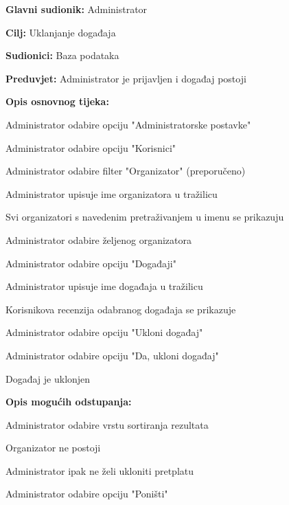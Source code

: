 					\noindent {}
					\begin{packed_item}
	
						\item \textbf{Glavni sudionik:} Administrator
						\item  \textbf{Cilj:} Uklanjanje događaja
						\item  \textbf{Sudionici:} Baza podataka
						\item  \textbf{Preduvjet:} Administrator je prijavljen i događaj postoji
						\item  \textbf{Opis osnovnog tijeka:}
						
						\item[] \begin{packed_enum}
	
							\item Administrator odabire opciju "Administratorske postavke"
							\item Administrator odabire opciju "Korisnici"
							\item Administrator odabire filter "Organizator" (preporučeno)
							\item Administrator upisuje ime organizatora u tražilicu
							\item Svi organizatori s navedenim pretraživanjem u imenu se prikazuju
							\item Administrator odabire željenog organizatora
							\item Administrator odabire opciju "Događaji"
							\item Administrator upisuje ime događaja u tražilicu
							\item Korisnikova recenzija odabranog događaja se prikazuje
							\item Administrator odabire opciju "Ukloni događaj"
							\item Administrator odabire opciju "Da, ukloni događaj"
							\item Događaj je uklonjen
						\end{packed_enum}
						
						\item  \textbf{Opis mogućih odstupanja:}
						
						\item[] \begin{packed_item}
	
							\item[3.b] Administrator odabire vrstu sortiranja rezultata
							\item[5.a] Organizator ne postoji
							\item[9.a] Administrator ipak ne želi ukloniti pretplatu
							\item[] \begin{packed_enum}
								
								\item Administrator odabire opciju "Poništi"
								
							\end{packed_enum}
						\end{packed_item}
					\end{packed_item}
				
